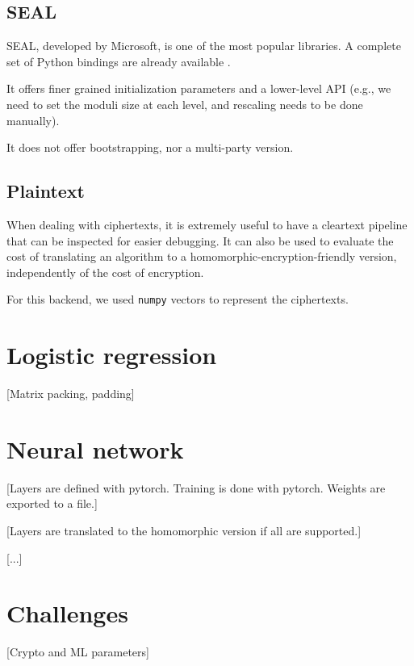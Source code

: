 \documentclass[a4paper,11pt,oneside]{report}
\begin{document}
\subsection{SEAL}

SEAL, developed by Microsoft, is one of the most popular libraries. A complete set of Python bindings are already available \cite{hugang_seal-python_2022}.

It offers finer grained initialization parameters and a lower-level API (e.g., we need to set the moduli size at each level, and rescaling needs to be done manually).

It does not offer bootstrapping, nor a multi-party version.

\subsection{Plaintext}

When dealing with ciphertexts, it is extremely useful to have a cleartext pipeline that can be inspected for easier debugging. It can also be used to evaluate the cost of translating an algorithm to a homomorphic-encryption-friendly version, independently of the cost of encryption. 

For this backend, we used \texttt{numpy} vectors to represent the ciphertexts.

\section{Logistic regression}

[Matrix packing, padding]


\section{Neural network}

[Layers are defined with pytorch. Training is done with pytorch. Weights are exported to a file.]

[Layers are translated to the homomorphic version if all are supported.]

[...]


\section{Challenges}

[Crypto and ML parameters]
\end{document}
